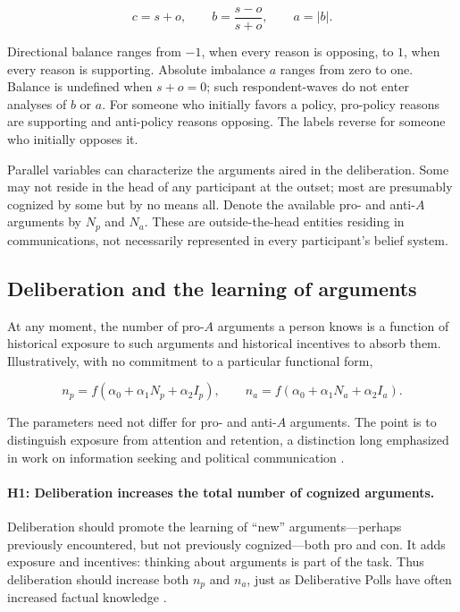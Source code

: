 \documentclass{article}
\begin{document}
\begin{equation}
c=s+o, \qquad b=\frac{s-o}{s+o}, \qquad a=|b|.
\end{equation}

Directional balance ranges from $-1$, when every reason is opposing, to $1$, when every reason
is supporting. Absolute imbalance $a$ ranges from zero to one. Balance is undefined when
$s+o=0$; such respondent-waves do not enter analyses of $b$ or $a$. For someone who initially
favors a policy, pro-policy reasons are supporting and anti-policy reasons opposing. The labels
reverse for someone who initially opposes it.

Parallel variables can characterize the arguments aired in the deliberation. Some may not
reside in the head of any participant at the outset; most are presumably cognized by some but
by no means all. Denote the available pro- and anti-$A$ arguments by $N_p$ and $N_a$. These are
outside-the-head entities residing in communications, not necessarily represented in every
participant's belief system.

\subsection{Deliberation and the learning of arguments}

At any moment, the number of pro-$A$ arguments a person knows is a function of historical
exposure to such arguments and historical incentives to absorb them. Illustratively, with no
commitment to a particular functional form,

\begin{equation}
n_p=f(\alpha_0+\alpha_1N_p+\alpha_2I_p), \qquad
n_a=f(\alpha_0+\alpha_1N_a+\alpha_2I_a).
\end{equation}

The parameters need not differ for pro- and anti-$A$ arguments. The point is to distinguish
exposure from attention and retention, a distinction long emphasized in work on information
seeking and political communication \citep{atkin1973instrumental,chaffee1972interpersonal,
chaffee1973individual}.

\paragraph{H1: Deliberation increases the total number of cognized arguments.}
Deliberation should promote the learning of ``new'' arguments---perhaps previously
encountered, but not previously cognized---both pro and con. It adds exposure and incentives:
thinking about arguments is part of the task. Thus deliberation should increase both $n_p$ and
$n_a$, just as Deliberative Polls have often increased factual knowledge
\citep{hansen2004deliberative,luskin2009learning}.
\end{document}
